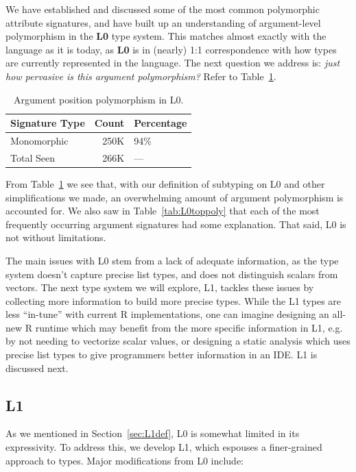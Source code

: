 \documentclass[acmsmall,10pt,review,anonymous]{acmart}\settopmatter{printfolios=true,printccs=false,printacmref=false}
\begin{document}
We have established and discussed some of the most common polymorphic attribute signatures, and have built up an understanding of argument-level polymorphism in the {\bf L0} type system.
This matches almost exactly with the language as it is today, as {\bf L0} is in (nearly) 1:1 correspondence with how types are currently represented in the language.
The next question we address is: {\it just how pervasive is this argument polymorphism?}
Refer to Table~\ref{tab:L0argcounts}.

\begin{table}[ht]\label{tab:L0argcounts}\centering
\begin{tabular}{lrl}
  \hline
Signature Type & Count & Percentage \\ 
  \hline
  Monomorphic & 250K & 94\% \\ 
  Total Seen & 266K & --- \\ 
   \hline
\end{tabular}
\caption{Argument position polymorphism in L0.}
\end{table}

From Table~\ref{tab:L0argcounts} we see that, with our definition of subtyping on L0 and other simplifications we made, an overwhelming amount of argument polymorphism is accounted for.
We also saw in Table~\ref{tab:L0toppoly} that each of the most frequently occurring argument signatures had some explanation.
That said, L0 is not without limitations.

The main issues with L0 stem from a lack of adequate information, as the type system doesn't capture precise list types, and does not distinguish scalars from vectors.
The next type system we will explore, L1, tackles these issues by collecting more information to build more precise types.
While the L1 types are less ``in-tune'' with current R implementations, one can imagine designing an all-new R runtime which may benefit from the more specific information in L1, e.g. by not needing to vectorize scalar values, or designing a static analysis which uses precise list types to give programmers better information in an IDE.
L1 is discussed next.


%
%
%
%
\subsection{L1}

As we mentioned in Section~\ref{sec:L1def}, L0 is somewhat limited in its expressivity. 
To address this, we develop L1, which espouses a finer-grained approach to types. 
Major modifications from L0 include:
\end{document}
